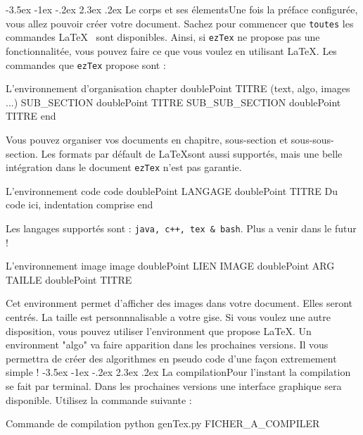 \documentclass[11pt, a4paper]{article}
\makeatletter
\renewcommand{\subsection}{\@startsection{subsection}{1}{\z@}%
          {-3.5ex \@plus -1ex \@minus -.2ex}%
          {2.3ex \@plus .2ex}%
          {\reset@font\large\bfseries}}
\renewcommand{\subsubsection}{\@startsection{subsubsection}{1}{\z@}%
          {-3.5ex \@plus -1ex \@minus -.2ex}%
          {2.3ex \@plus .2ex}%
          {\reset@font\large\bfseries}}
\makeatother
\begin{document}
\subsubsection{Le corps et ses élements}Une fois la préface configurée, vous allez pouvoir créer votre document. Sachez pour commencer que \texttt{toutes} les commandes \LaTeX~ sont disponibles.
Ainsi, si \texttt{ezTex} ne propose pas une fonctionnalitée, vous pouvez faire ce que vous voulez en utilisant \LaTeX. \newline
Les commandes que \texttt{ezTex} propose sont :
\begin{bashCode}{L'environnement d'organisation} 
chapter doublePoint TITRE
	(text, algo, images ...)
	SUB_SECTION doublePoint TITRE
	SUB_SUB_SECTION doublePoint TITRE
end
\end{bashCode} 
Vous pouvez organiser vos documents en chapitre, sous-section et sous-sous-section. Les formats par défault de \LaTeX sont aussi supportés, mais
une belle intégration dans le document \texttt{ezTex} n'est pas garantie. \newline
\begin{bashCode}{L'environnement code} 
code doublePoint LANGAGE doublePoint TITRE
	Du code ici, indentation
		comprise
end
\end{bashCode} 
Les langages supportés sont : \texttt{java, c++, tex \& bash}. Plus a venir dans le futur ! \newline
\begin{bashCode}{L'environnement image} 
image doublePoint LIEN IMAGE doublePoint ARG TAILLE doublePoint TITRE
\end{bashCode} 
Cet environment permet d'afficher des images dans votre document. Elles seront centrés. La taille est personnnalisable a votre gise. Si vous voulez une autre
disposition, vous pouvez utiliser l'environment que propose \LaTeX. \newline
Un environment "algo" va faire apparition dans les prochaines versions. Il vous permettra de créer des algorithmes en pseudo code d'une façon extremement simple !
\newpage
\subsection{La compilation}Pour l'instant la compilation se fait par terminal. Dans les prochaines versions une interface graphique sera disponible. Utilisez la commande suivante :
\begin{bashCode}{Commande de compilation} 
python genTex.py FICHER\_A\_COMPILER
\end{bashCode} 
\end{document}
